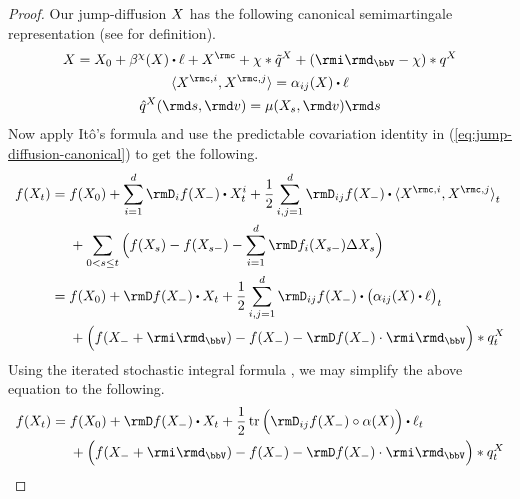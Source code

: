\begin{proof}
  \label{proof:lemma:ito}
  Our jump-diffusion $X$ has the following canonical semimartingale representation (see \cite[Theorem II.2.34]{jacod2003} for definition).
  \begin{equation}
    \label{eq:jump-diffusion-canonical}
    \begin{gathered}
      \X = \X_0 + \affDrift^\trunc(\X) \shortInt \leb + \X^\rmc +  \trunc \ast \compensate{\jumpMeas^\X} + (\id_\vecSpace - \trunc) \ast \jumpMeas^\X \\
      \prj{\X^{\rmc,i}}{\X^{\rmc,j}} = \affDiff_{ij}(\X) \shortInt \leb \\
      \predproj{\jumpMeas^\X}(\rmd s, \rmd\markVar) = \affJump(\X_s, \rmd\markVar) \rmd s
    \end{gathered}
  \end{equation}
  Now apply It\^o's formula \cite[Theorem I.4.57]{jacod2003} and use the predictable covariation identity in (\ref{eq:jump-diffusion-canonical}) to get the following.
  \begin{align*}
    f(\X_t) 
    &= \begin{aligned}[t]
      &f(\X_0) + \sum_{i=1}^d \Der_i f(\X_-) \shortInt \X^i_t + \frac12\sum_{i,j=1}^d \Der_{ij} f(\X_-) \shortInt \prj{\X^{\rmc,i}}{\X^{\rmc,j}}_t \\
      &+ \sum_{0<s\leq t} \Big( f(\X_s) - f(\X_{s-}) - \sum_{i=1}^d \Der f_i(\X_{s-}) \Delta\X_s \Big)
    \end{aligned} \\
    &= \begin{aligned}[t]
      &f(\X_0) + \Der f(\X_-) \shortInt \X_t + \frac12\sum_{i,j=1}^d \Der_{ij} f(\X_-) \shortInt \big(\affDiff_{ij}(\X) \shortInt \leb\big)_t \\
      &+ \Big( f(\X_-+\id_\vecSpace) - f(\X_-) - \Der f(\X_-) \cdot \id_\vecSpace \Big) \ast \jumpMeas^\X_t
    \end{aligned}
  \end{align*}
  Using the iterated stochastic integral formula \cite[Remark I.4.37]{jacod2003}, we may simplify the above equation to the following.
  \begin{equation*}
    f(\X_t) = \begin{aligned}[t]
      &f(\X_0) + \Der f(\X_-) \shortInt \X_t + \frac12 \tr \Big( \Der_{ij} f(\X_-) \circ \affDiff(\X) \Big) \shortInt \leb_t \\
      &+ \Big( f(\X_-+\id_\vecSpace) - f(\X_-) - \Der f(\X_-) \cdot \id_\vecSpace \Big) \ast \jumpMeas^\X_t

\end{aligned}
\end{equation*}
\end{proof}
